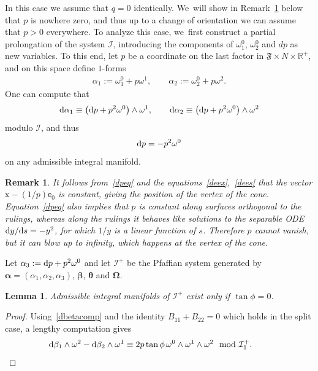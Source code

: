 \documentclass[10pt,a4paper]{amsart}
\def\R{\mathbb{R}}
\def\ve{\mathsf{e}}
\def\vx{\boldsymbol{\mathrm{x}}}
\def\vOmega{\boldsymbol{\Omega}}
\def\vbeta{\boldsymbol{\beta}}
\def\vtheta{\boldsymbol{\theta}}
\def\valpha{\boldsymbol{\alpha}}
\def\vOmega{\boldsymbol{\Omega}}
\def\F{\mathfrak{F}}
\def\calI{\mathcal{I}}
\def\w{\omega}
\newtheorem{Lemma}[Theorem]{Lemma}
\newtheorem{Remark}[Theorem]{Remark}}
\numberwithin{equation}{section}
\begin{document}
In this case we assume that $q=0$ identically. We~will show in Remark~\ref{prmk} below that $p$ is nowhere zero, and thus up to a change of orientation we can assume that $p > 0$ everywhere. To analyze this case, we~first construct a partial prolongation of the system $\calI$, introducing the components of $\w^0_1$, $\w^0_2$ and $dp$ as new variables.
To this end, let $p$ be a coordinate on the last factor in $\F\times N\times \R^+$, and on this space define $1$-forms
\begin{gather} \label{coneadd78}
\alpha_1 := \w^0_1 + p \w^1, \qquad \alpha_2 := \w^0_2 + p\w^2.
\end{gather}
One can compute that
\begin{gather*}
{\rm d}\alpha_1 \equiv \big({\rm d}p+p^2 \w^0\big)\wedge \w^1, \qquad
{\rm d}\alpha_2 \equiv \big({\rm d}p+p^2 \w^0\big)\wedge \w^2
\end{gather*}
modulo $\calI$, and thus
\begin{gather} \label{dpeq}
{\rm d}p = -p^2 \w^0
\end{gather}
on any admissible integral manifold.

\begin{Remark} \label{prmk}
It follows from~\eqref{dpeq} and the equations~\eqref{deex},~\eqref{dees} that the vector $\vx - (1/p) \ve_0$ is constant, giving the position of the vertex of the cone. Equation~\eqref{dpeq} also implies that $p$ is constant along surfaces orthogonal to the rulings, whereas along the rulings it behaves like solutions to the separable ODE ${\rm d}y/{\rm d}s = -y^2$, for which $1/y$ is a linear function of $s$. Therefore $p$ cannot vanish, but it can blow up to infinity, which happens at the vertex of the cone.
\end{Remark}

Let $\alpha_3 := {\rm d}p+p^2 \w^0$ and let $\calI^+$ be the Pfaffian system generated by $\valpha=(\alpha_1,\alpha_2,\alpha_3)$, $\vbeta$, $\vtheta$ and $\vOmega$.

\begin{Lemma} \label{conelemma}
Admissible integral manifolds of $\calI^+$ exist only if $\tan\phi=0$.
\end{Lemma}
\begin{proof}
Using~\eqref{dbetacomp} and the identity $B_{11} + B_{22} = 0$ which holds in the split case, a lengthy computation gives
\begin{gather*}
{\rm d}\beta_1 \wedge \w^2 - {\rm d}\beta_2 \wedge \w^1 \equiv 2p \tan\phi \, \w^0 \wedge \w^1 \wedge \w^2 \mod \calI^+_1. \tag*{\qed}
\end{gather*}
\renewcommand{\qed}{}
\end{proof}
\end{document}
